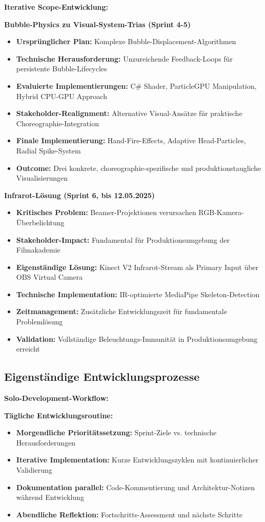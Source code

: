\textbf{Iterative Scope-Entwicklung:}

\textbf{Bubble-Physics zu Visual-System-Trias (Sprint 4-5)}
\begin{itemize}
    \item \textbf{Ursprünglicher Plan:} Komplexe Bubble-Displacement-Algorithmen
    \item \textbf{Technische Herausforderung:} Unzureichende Feedback-Loops für persistente Bubble-Lifecycles
    \item \textbf{Evaluierte Implementierungen:} C\# Shader, ParticleGPU Manipulation, Hybrid CPU-GPU Approach
    \item \textbf{Stakeholder-Realignment:} Alternative Visual-Ansätze für praktische Choreographie-Integration
    \item \textbf{Finale Implementierung:} Hand-Fire-Effects, Adaptive Head-Particles, Radial Spike-System
    \item \textbf{Outcome:} Drei konkrete, choreographie-spezifische und produktionstaugliche Visualisierungen
\end{itemize}

\textbf{Infrarot-Lösung (Sprint 6, bis 12.05.2025)}
\begin{itemize}
    \item \textbf{Kritisches Problem:} Beamer-Projektionen verursachen RGB-Kamera-Überbelichtung
    \item \textbf{Stakeholder-Impact:} Fundamental für Produktionsumgebung der Filmakademie
    \item \textbf{Eigenständige Lösung:} Kinect V2 Infrarot-Stream als Primary Input über OBS Virtual Camera
    \item \textbf{Technische Implementation:} IR-optimierte MediaPipe Skeleton-Detection
    \item \textbf{Zeitmanagement:} Zusätzliche Entwicklungszeit für fundamentale Problemlösung
    \item \textbf{Validation:} Vollständige Beleuchtungs-Immunität in Produktionsumgebung erreicht
\end{itemize}

\subsection{Eigenständige Entwicklungsprozesse}

\textbf{Solo-Development-Workflow:}

\textbf{Tägliche Entwicklungsroutine:}
\begin{itemize}
    \item \textbf{Morgendliche Prioritätssetzung:} Sprint-Ziele vs. technische Herausforderungen
    \item \textbf{Iterative Implementation:} Kurze Entwicklungszyklen mit kontinuierlicher Validierung
    \item \textbf{Dokumentation parallel:} Code-Kommentierung und Architektur-Notizen während Entwicklung
    \item \textbf{Abendliche Reflektion:} Fortschritts-Assessment und nächste Schritte
\end{itemize}


